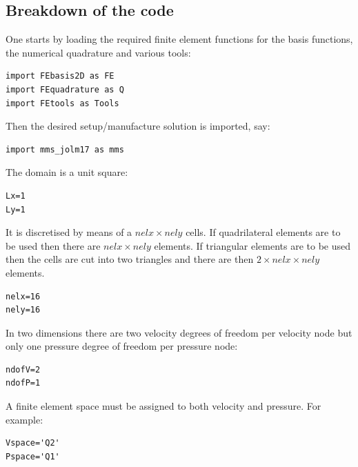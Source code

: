 \newpage
\subsection*{Breakdown of the code}

One starts by loading the required finite element functions 
for the basis functions, the numerical quadrature and various tools:
\begin{lstlisting}
import FEbasis2D as FE
import FEquadrature as Q
import FEtools as Tools 
\end{lstlisting}

Then the desired setup/manufacture solution is imported, say:
\begin{lstlisting}
import mms_jolm17 as mms
\end{lstlisting}


The domain is a unit square:
\begin{lstlisting}
Lx=1
Ly=1
\end{lstlisting}

It is discretised by means of a $nelx\times nely$ cells. If quadrilateral 
elements are to be used then there are $nelx\times nely$ elements. If 
triangular elements are to be used then the cells are cut into two 
triangles and there are then $2\times nelx\times nely$ elements.

\begin{lstlisting}
nelx=16
nely=16
\end{lstlisting}


In two dimensions there are two velocity degrees of freedom per 
velocity node but only one pressure degree of freedom per pressure node:
\begin{lstlisting}
ndofV=2
ndofP=1
\end{lstlisting}

A finite element space must be assigned to both velocity and pressure. For example: 
\begin{lstlisting}
Vspace='Q2'
Pspace='Q1'
\end{lstlisting}

